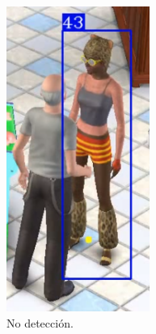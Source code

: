 \begin{figure}[!htpb]
\begin{subfigure}[b]{0.3\textwidth}
         \includegraphics[width=.65\textwidth]{./Figures/fallasDetector2.png}
         \caption{No detección.}
         \label{fig:fallasDetector2de3}
     \end{subfigure}
     \hfill
     \begin{subfigure}[b]{0.3\textwidth}
         \centering

\end{subfigure}
\end{figure}
